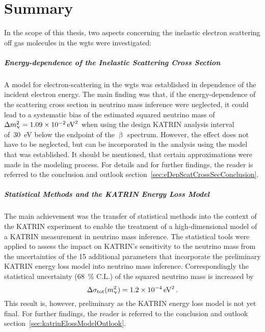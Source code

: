 \chapter{Summary}
\label{sec:conclusion}
In the scope of this thesis, two aspects concerning the inelastic electron scattering off gas molecules in the \gls{wgts} were investigated:

\paragraph{Energy-dependence of the Inelastic Scattering Cross Section}
A model for electron-scattering in the \gls{wgts} was established in dependence of the incident electron energy. The main finding was that, if the energy-dependence of the scattering cross section in neutrino mass inference were neglected, it could lead to a systematic bias of the estimated squared neutrino mass of $\Delta m_\upnu^2 = \SI{1.09e-2}{eV^2}$ when using the design KATRIN analysis interval of~\SI{30}{eV} below the endpoint of the $\upbeta$ spectrum. However, the effect does not have to be neglected, but can be incorporated in the analysis using the model that was established. It should be mentioned, that certain approximations were made in the modeling process. For details and for further findings, the reader is referred to the conclusion and outlook section~\ref{sec:eDepScatCrossSecConclusion}.

\paragraph{Statistical Methods and the KATRIN Energy Loss Model}
The main achievement was the transfer of statistical methods into the context of the KATRIN experiment to enable the treatment of a high-dimensional model of a KATRIN measurement in neutrino mass inference. The statistical tools were applied to assess the impact on KATRIN's sensitivity to the neutrino mass from the uncertainties of the 15 additional parameters that incorporate the preliminary KATRIN energy loss model into neutrino mass inference. Correspondingly the statistical uncertainty (\SI{68}{\percent} C.L.) of the squared neutrino mass is increased by
\begin{equation*}
\Delta \sigma_\mathrm{tot}(m_\upnu^2) = \SI{1.2e-4}{eV^2}
\text{\,.} 
\end{equation*} 
This result is, however, preliminary as the KATRIN energy loss model is not yet final. For further findings, the reader is referred to the conclusion and outlook section~\ref{sec:katrinElossModelOutlook}.
